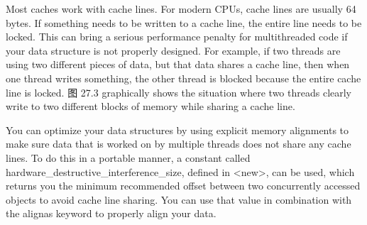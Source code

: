 
Most caches work with cache lines. For modern CPUs, cache lines are usually 64 bytes. If something needs to be written to a cache line, the entire line needs to be locked. This can bring a serious performance penalty for multithreaded code if your data structure is not properly designed. For example, if two threads are using two different pieces of data, but that data shares a cache line, then when one thread writes something, the other thread is blocked because the entire cache line is locked. 图 27.3 graphically shows the situation where two threads clearly write to two different blocks of memory while sharing a cache line.


You can optimize your data structures by using explicit memory alignments to make sure data that is worked on by multiple threads does not share any cache lines. To do this in a portable manner, a constant called hardware\_destructive\_interference\_size, defined in <new>, can be used, which returns you the minimum recommended offset between two concurrently accessed objects to avoid cache line sharing. You can use that value in combination with the alignas keyword to properly align your data.







